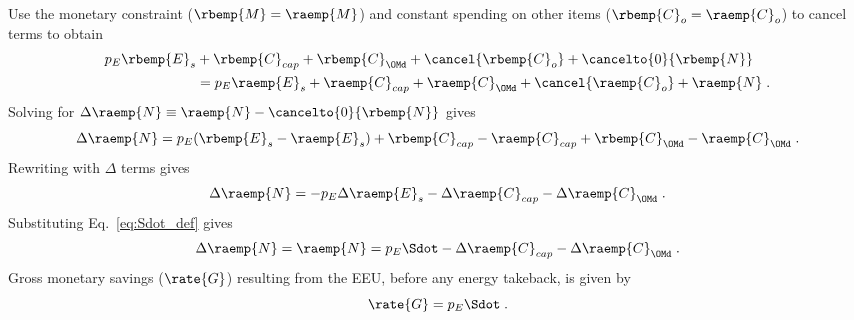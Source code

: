 \begin{landscape}
{Use the monetary constraint ($\rbemp{M} = \raemp{M}$)
and constant spending on other items ($\rbemp{C}_o = \raemp{C}_o$) to cancel terms to obtain
%
\begin{align}
  p_E \rbemp{E}_s &+ \rbemp{C}_{cap} + \rbemp{C}_{\OMd} + \cancel{\rbemp{C}_o} + \cancelto{0}{\rbemp{N}} \nonumber \\
                  &= p_E \raemp{E}_s + \raemp{C}_{cap} + \raemp{C}_{\OMd} + \cancel{\raemp{C}_o}  + \raemp{N} \; .
\end{align}
%
Solving for $\Delta \raemp{N} \equiv \raemp{N} - \cancelto{0}{\rbemp{N}}$ gives 
%
\begin{equation}
  \Delta \raemp{N} = p_E(\rbemp{E}_s - \raemp{E}_s) 
                     + \rbemp{C}_{cap} - \raemp{C}_{cap}
                     + \rbemp{C}_{\OMd} - \raemp{C}_{\OMd} \; .
\end{equation}
%
Rewriting with $\Delta$ terms gives
%
\begin{equation}
  \Delta \raemp{N} = - p_E \Delta \raemp{E}_s - \Delta \raemp{C}_{cap} - \Delta \raemp{C}_{\OMd} \; .
\end{equation}
%
Substituting Eq.~\ref{eq:Sdot_def} gives
%
\begin{equation}
  \Delta \raemp{N} = \raemp{N} = p_E \Sdot - \Delta \raemp{C}_{cap} - \Delta \raemp{C}_{\OMd} \; .
\end{equation}
%
Gross monetary savings ($\rate{G}$) resulting from the EEU, 
before any energy takeback, is given by 
%
\begin{equation} \label{eq:G_dot}
  \rate{G} = p_E \Sdot \; .
\end{equation}
}

\end{landscape}

